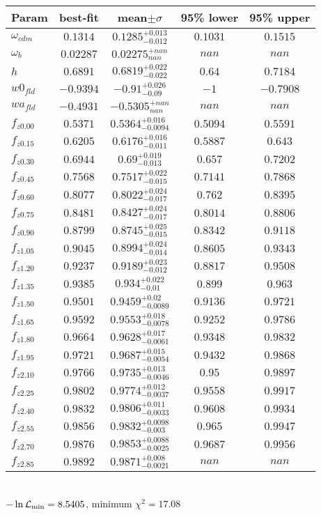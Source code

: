 \begin{tabular}{|l|c|c|c|c|} 
 \hline 
Param & best-fit & mean$\pm\sigma$ & 95\% lower & 95\% upper \\ \hline 
$\omega_{cdm }$ &$0.1314$ & $0.1285_{-0.012}^{+0.013}$ & $0.1031$ & $0.1515$ \\ 
$\omega_{b }$ &$0.02287$ & $0.02275_{nan}^{+nan}$ & $nan$ & $nan$ \\ 
$h$ &$0.6891$ & $0.6819_{-0.022}^{+0.022}$ & $0.64$ & $0.7184$ \\ 
$w0_{fld }$ &$-0.9394$ & $-0.91_{-0.09}^{+0.026}$ & $-1$ & $-0.7908$ \\ 
$wa_{fld }$ &$-0.4931$ & $-0.5305_{nan}^{+nan}$ & $nan$ & $nan$ \\ 
$f_{z0.00 }$ &$0.5371$ & $0.5364_{-0.0094}^{+0.016}$ & $0.5094$ & $0.5591$ \\ 
$f_{z0.15 }$ &$0.6205$ & $0.6176_{-0.011}^{+0.016}$ & $0.5887$ & $0.643$ \\ 
$f_{z0.30 }$ &$0.6944$ & $0.69_{-0.013}^{+0.019}$ & $0.657$ & $0.7202$ \\ 
$f_{z0.45 }$ &$0.7568$ & $0.7517_{-0.015}^{+0.022}$ & $0.7141$ & $0.7868$ \\ 
$f_{z0.60 }$ &$0.8077$ & $0.8022_{-0.017}^{+0.024}$ & $0.762$ & $0.8395$ \\ 
$f_{z0.75 }$ &$0.8481$ & $0.8427_{-0.017}^{+0.024}$ & $0.8014$ & $0.8806$ \\ 
$f_{z0.90 }$ &$0.8799$ & $0.8745_{-0.015}^{+0.025}$ & $0.8342$ & $0.9118$ \\ 
$f_{z1.05 }$ &$0.9045$ & $0.8994_{-0.014}^{+0.024}$ & $0.8605$ & $0.9343$ \\ 
$f_{z1.20 }$ &$0.9237$ & $0.9189_{-0.012}^{+0.023}$ & $0.8817$ & $0.9508$ \\ 
$f_{z1.35 }$ &$0.9385$ & $0.934_{-0.01}^{+0.022}$ & $0.899$ & $0.963$ \\ 
$f_{z1.50 }$ &$0.9501$ & $0.9459_{-0.0089}^{+0.02}$ & $0.9136$ & $0.9721$ \\ 
$f_{z1.65 }$ &$0.9592$ & $0.9553_{-0.0078}^{+0.018}$ & $0.9252$ & $0.9786$ \\ 
$f_{z1.80 }$ &$0.9664$ & $0.9628_{-0.0061}^{+0.017}$ & $0.9348$ & $0.9832$ \\ 
$f_{z1.95 }$ &$0.9721$ & $0.9687_{-0.0054}^{+0.015}$ & $0.9432$ & $0.9868$ \\ 
$f_{z2.10 }$ &$0.9766$ & $0.9735_{-0.0046}^{+0.013}$ & $0.95$ & $0.9897$ \\ 
$f_{z2.25 }$ &$0.9802$ & $0.9774_{-0.0037}^{+0.012}$ & $0.9558$ & $0.9917$ \\ 
$f_{z2.40 }$ &$0.9832$ & $0.9806_{-0.0033}^{+0.011}$ & $0.9608$ & $0.9934$ \\ 
$f_{z2.55 }$ &$0.9856$ & $0.9832_{-0.003}^{+0.0098}$ & $0.965$ & $0.9947$ \\ 
$f_{z2.70 }$ &$0.9876$ & $0.9853_{-0.0025}^{+0.0088}$ & $0.9687$ & $0.9956$ \\ 
$f_{z2.85 }$ &$0.9892$ & $0.9871_{-0.0021}^{+0.008}$ & $nan$ & $nan$ \\ 
\hline 
 \end{tabular} \\ 
$-\ln{\cal L}_\mathrm{min} =8.5405$, minimum $\chi^2=17.08$ \\ 
